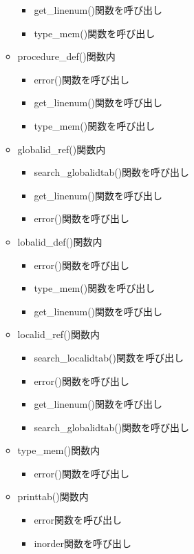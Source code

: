 \documentclass{jarticle}
\begin{document}
\begin{itemize}
\begin{itemize}
\begin{itemize}
      \item get\_linenum()関数を呼び出し
      \item type\_mem()関数を呼び出し
    \end{itemize}
    \item procedure\_def()関数内
    \begin{itemize}
      \item error()関数を呼び出し
      \item get\_linenum()関数を呼び出し
      \item type\_mem()関数を呼び出し
    \end{itemize}
    \item globalid\_ref()関数内
    \begin{itemize}
      \item search\_globalidtab()関数を呼び出し
      \item get\_linenum()関数を呼び出し
      \item error()関数を呼び出し
    \end{itemize}
    \item lobalid\_def()関数内
    \begin{itemize}
      \item error()関数を呼び出し
      \item type\_mem()関数を呼び出し
      \item get\_linenum()関数を呼び出し
    \end{itemize}
    \item localid\_ref()関数内
    \begin{itemize}
      \item search\_localidtab()関数を呼び出し
      \item error()関数を呼び出し
      \item get\_linenum()関数を呼び出し
      \item search\_globalidtab()関数を呼び出し
    \end{itemize}
    \item type\_mem()関数内
    \begin{itemize}
      \item error()関数を呼び出し
    \end{itemize}
    \item printtab()関数内
    \begin{itemize}
      \item error関数を呼び出し
      \item inorder関数を呼び出し
    \end{itemize}

\end{itemize}
\end{itemize}
\end{document}
